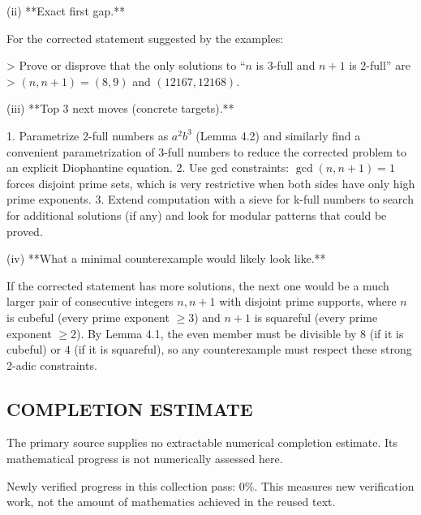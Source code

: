(ii) **Exact first gap.**

For the corrected statement suggested by the examples:

> Prove or disprove that the only solutions to “\(n\) is 3-full and \(n+1\) is 2-full” are
> \((n,n+1)=(8,9)\) and \((12167,12168)\).

(iii) **Top 3 next moves (concrete targets).**

1. Parametrize 2-full numbers as \(a^2 b^3\) (Lemma 4.2) and similarly find a convenient
   parametrization of 3-full numbers to reduce the corrected problem to an explicit Diophantine
   equation.
2. Use gcd constraints: \(\gcd(n,n+1)=1\) forces disjoint prime sets, which is very restrictive when
   both sides have only high prime exponents.
3. Extend computation with a sieve for k-full numbers to search for additional solutions (if any)
   and look for modular patterns that could be proved.

(iv) **What a minimal counterexample would likely look like.**

If the corrected statement has more solutions, the next one would be a much larger pair of
consecutive integers \(n,n+1\) with disjoint prime supports, where \(n\) is cubeful (every prime
exponent \(\ge 3\)) and \(n+1\) is squareful (every prime exponent \(\ge 2\)). By Lemma 4.1, the even
member must be divisible by \(8\) (if it is cubeful) or \(4\) (if it is squareful), so any counterexample
must respect these strong 2-adic constraints.




\subsection*{COMPLETION ESTIMATE}
The primary source supplies no extractable numerical completion estimate. Its mathematical progress is not numerically assessed here.

Newly verified progress in this collection pass: $0\%$. This measures new verification work, not the amount of mathematics achieved in the reused text.

